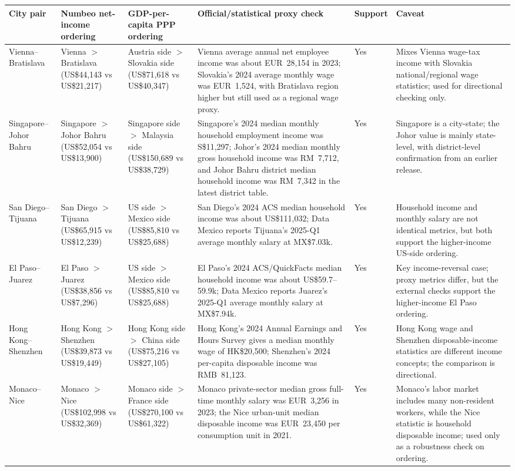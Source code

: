 \begin{tabular}{@{}p{2.5cm}p{2.9cm}p{2.8cm}p{4.4cm}p{1.6cm}p{3.3cm}@{}}
\toprule
City pair & Numbeo net-income ordering & GDP-per-capita PPP ordering & Official/statistical proxy check & Support & Caveat \\
\midrule
Vienna--Bratislava & Vienna $>$ Bratislava (US\$44,143 vs US\$21,217) & Austria side $>$ Slovakia side (US\$71,618 vs US\$40,347) & Vienna average annual net employee income was about EUR~28,154 in 2023; Slovakia's 2024 average monthly wage was EUR~1,524, with Bratislava region higher but still used as a regional wage proxy. & Yes & Mixes Vienna wage-tax income with Slovakia national/regional wage statistics; used for directional checking only. \\
Singapore--Johor Bahru & Singapore $>$ Johor Bahru (US\$52,054 vs US\$13,900) & Singapore side $>$ Malaysia side (US\$150,689 vs US\$38,729) & Singapore's 2024 median monthly household employment income was S\$11,297; Johor's 2024 median monthly gross household income was RM~7,712, and Johor Bahru district median household income was RM~7,342 in the latest district table. & Yes & Singapore is a city-state; the Johor value is mainly state-level, with district-level confirmation from an earlier release. \\
San Diego--Tijuana & San Diego $>$ Tijuana (US\$65,915 vs US\$12,239) & US side $>$ Mexico side (US\$85,810 vs US\$25,688) & San Diego's 2024 ACS median household income was about US\$111,032; Data Mexico reports Tijuana's 2025-Q1 average monthly salary at MX\$7.03k. & Yes & Household income and monthly salary are not identical metrics, but both support the higher-income US-side ordering. \\
El Paso--Juarez & El Paso $>$ Juarez (US\$38,856 vs US\$7,296) & US side $>$ Mexico side (US\$85,810 vs US\$25,688) & El Paso's 2024 ACS/QuickFacts median household income was about US\$59.7--59.9k; Data Mexico reports Juarez's 2025-Q1 average monthly salary at MX\$7.94k. & Yes & Key income-reversal case; proxy metrics differ, but the external checks support the higher-income El Paso ordering. \\
Hong Kong--Shenzhen & Hong Kong $>$ Shenzhen (US\$39,873 vs US\$19,449) & Hong Kong side $>$ China side (US\$75,216 vs US\$27,105) & Hong Kong's 2024 Annual Earnings and Hours Survey gives a median monthly wage of HK\$20,500; Shenzhen's 2024 per-capita disposable income was RMB~81,123. & Yes & Hong Kong wage and Shenzhen disposable-income statistics are different income concepts; the comparison is directional. \\
Monaco--Nice & Monaco $>$ Nice (US\$102,998 vs US\$32,369) & Monaco side $>$ France side (US\$270,100 vs US\$61,322) & Monaco private-sector median gross full-time monthly salary was EUR~3,256 in 2023; the Nice urban-unit median disposable income was EUR~23,450 per consumption unit in 2021. & Yes & Monaco's labor market includes many non-resident workers, while the Nice statistic is household disposable income; used only as a robustness check on ordering. \\
\bottomrule
\end{tabular}
